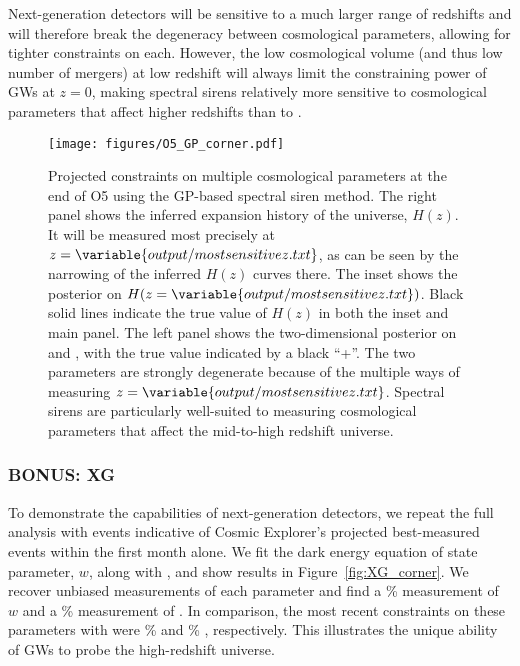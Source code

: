 \documentclass[]{aastex631}
\begin{document}
Next-generation detectors will be sensitive to a much larger range of redshifts \citep{something!} and will therefore break the degeneracy between cosmological parameters, allowing for tighter constraints on each.
However, the low cosmological volume (and thus low number of mergers) at low redshift will always limit the constraining power of \acp{GW} at $z=0$, making spectral sirens relatively more sensitive to cosmological parameters that affect higher redshifts than to \Ho.

\begin{figure*}
    \centering
    \texttt{[image: figures/O5\_GP\_corner.pdf]}
    \caption{
    Projected constraints on multiple cosmological parameters at the end of \ac{O5} using the \acl{GP}-based spectral siren method.
    The right panel shows the inferred expansion history of the universe, $H(z)$.
    It will be measured most precisely at $z=\variable{output/mostsensitivez.txt}$, as can be seen by the narrowing of the inferred $H(z)$ curves there.
    The inset shows the posterior on $H(z=\variable{output/mostsensitivez.txt})$.
    Black solid lines indicate the true value of $H(z)$ in both the inset and main panel.
    The left panel shows the two-dimensional posterior on \Ho{} and \Omm, with the true value indicated by a black ``+''.
    The two parameters are strongly degenerate because of the multiple ways of measuring $z=\variable{output/mostsensitivez.txt}$.
    Spectral sirens are particularly well-suited to measuring cosmological parameters that affect the mid-to-high redshift universe. 
    }
    \label{fig:O5_corner}
\end{figure*}

\subsubsection{BONUS: XG}
To demonstrate the capabilities of next-generation detectors, we repeat the full analysis with  events indicative of Cosmic Explorer's projected best-measured events within the first month alone.
We fit the dark energy equation of state parameter, $w$, along with \Ho, and show results in Figure~\ref{fig:XG_corner}.
We recover unbiased measurements of each parameter and find a \% measurement of $w$ and a \% measurement of \Ho.
In comparison, the most recent constraints on these parameters with  were \% and \% , respectively.
This illustrates the unique ability of \acp{GW} to probe the high-redshift universe.
\end{document}
